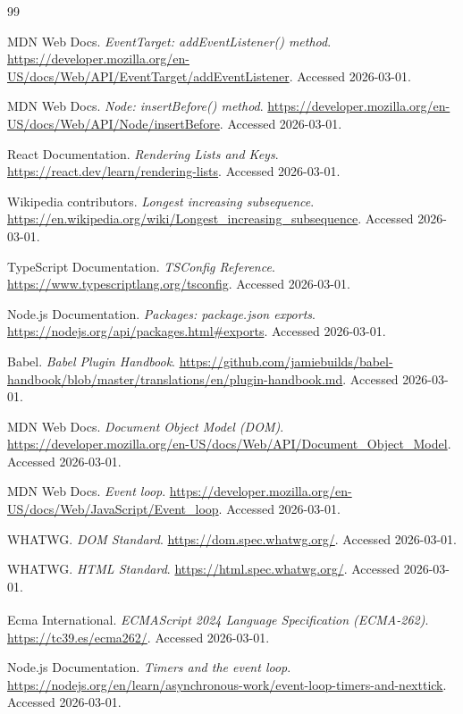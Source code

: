 \documentclass[11pt,oneside]{book}
\begin{document}
\begin{thebibliography}{99}

MDN Web Docs.
\emph{EventTarget: addEventListener() method}.
\url{https://developer.mozilla.org/en-US/docs/Web/API/EventTarget/addEventListener}.
Accessed 2026-03-01.

MDN Web Docs.
\emph{Node: insertBefore() method}.
\url{https://developer.mozilla.org/en-US/docs/Web/API/Node/insertBefore}.
Accessed 2026-03-01.

React Documentation.
\emph{Rendering Lists and Keys}.
\url{https://react.dev/learn/rendering-lists}.
Accessed 2026-03-01.

Wikipedia contributors.
\emph{Longest increasing subsequence}.
\url{https://en.wikipedia.org/wiki/Longest_increasing_subsequence}.
Accessed 2026-03-01.

TypeScript Documentation.
\emph{TSConfig Reference}.
\url{https://www.typescriptlang.org/tsconfig}.
Accessed 2026-03-01.

Node.js Documentation.
\emph{Packages: package.json exports}.
\url{https://nodejs.org/api/packages.html#exports}.
Accessed 2026-03-01.

Babel.
\emph{Babel Plugin Handbook}.
\url{https://github.com/jamiebuilds/babel-handbook/blob/master/translations/en/plugin-handbook.md}.
Accessed 2026-03-01.

MDN Web Docs.
\emph{Document Object Model (DOM)}.
\url{https://developer.mozilla.org/en-US/docs/Web/API/Document_Object_Model}.
Accessed 2026-03-01.

MDN Web Docs.
\emph{Event loop}.
\url{https://developer.mozilla.org/en-US/docs/Web/JavaScript/Event_loop}.
Accessed 2026-03-01.

WHATWG.
\emph{DOM Standard}.
\url{https://dom.spec.whatwg.org/}.
Accessed 2026-03-01.

WHATWG.
\emph{HTML Standard}.
\url{https://html.spec.whatwg.org/}.
Accessed 2026-03-01.

Ecma International.
\emph{ECMAScript\textsuperscript{\textregistered} 2024 Language Specification (ECMA-262)}.
\url{https://tc39.es/ecma262/}.
Accessed 2026-03-01.

Node.js Documentation.
\emph{Timers and the event loop}.
\url{https://nodejs.org/en/learn/asynchronous-work/event-loop-timers-and-nexttick}.
Accessed 2026-03-01.


\end{thebibliography}
\end{document}

